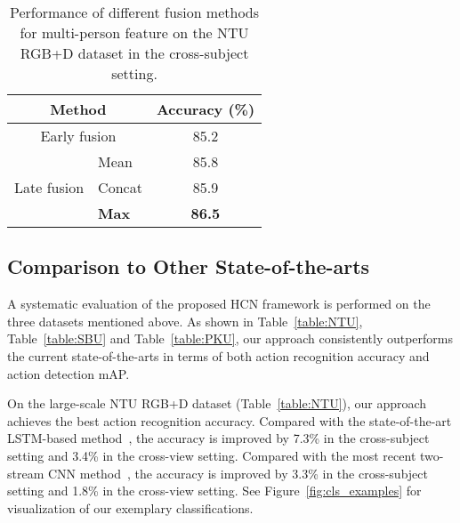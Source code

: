 \documentclass{article}
\begin{document}
\begin{table}[htbp]
  \centering
  \begin{tabular}{c|l|c}\hline
    \multicolumn{2}{c|}{Method} & Accuracy (\%) \\ \hline
    \multicolumn{2}{c|}{Early fusion} & 85.2 \\ \hline
    \multirow{3}{*}{Late fusion} &Mean &85.8 \\ 
     &Concat &85.9 \\ 
    &{\bfseries Max} &{\bfseries 86.5} \\ \hline
  \end{tabular}
\caption{Performance of different fusion methods for multi-person feature on the NTU RGB+D dataset in the cross-subject setting.}
  \label{table:multi_person_fusion}
\end{table}

\subsection{Comparison to Other State-of-the-arts}
A systematic evaluation of the proposed HCN framework is performed on the three datasets mentioned above. As shown in Table~\ref{table:NTU}, Table~\ref{table:SBU} and Table~\ref{table:PKU}, our approach consistently outperforms the current state-of-the-arts in terms of both action recognition accuracy and action detection mAP.

On the large-scale NTU RGB+D dataset (Table~\ref{table:NTU}), our approach achieves the best action recognition accuracy. Compared with the state-of-the-art LSTM-based method~\cite{view_adaptive}, the accuracy is improved by 7.3\% in the cross-subject setting and 3.4\% in the cross-view setting. Compared with the most recent two-stream CNN method~\cite{Li_2017_ICMEW}, the accuracy is improved by 3.3\% in the cross-subject setting and 1.8\% in the cross-view setting. See Figure~\ref{fig:cls_examples} for visualization of our exemplary classifications.
\end{document}

